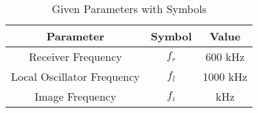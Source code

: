 \begin{table}[h]
    \centering
    \begin{tabular}{|c|c|c|}
        \hline
        \textbf{Parameter} & \textbf{Symbol} & \textbf{Value} \\
        \hline
        Receiver Frequency & \(f_r\) & 600 kHz \\
        \hline
        Local Oscillator Frequency & \(f_l\) & 1000 kHz \\
        \hline
        Image Frequency & \(f_i\) & \underline{\hspace{2cm}} kHz \\
        \hline
    \end{tabular}
    \caption{Given Parameters with Symbols}
    \label{tab:receiver_parameters}
\end{table}
